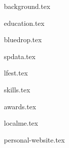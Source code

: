 \documentclass[11pt]{article}
\begin{document}
{background.tex}


{education.tex}


{bluedrop.tex}

{spdata.tex}

{lfest.tex}


{skills.tex}


{awards.tex}


{localme.tex}

{personal-website.tex}
\end{document}
